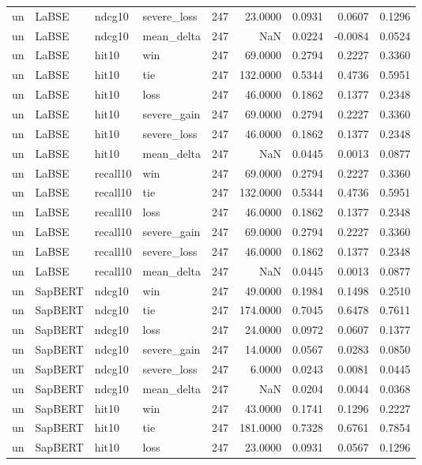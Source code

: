 \begin{tabular}{llllrrrrr}
un & LaBSE & ndcg10 & severe\_loss & 247 & 23.0000 & 0.0931 & 0.0607 & 0.1296 \\
un & LaBSE & ndcg10 & mean\_delta & 247 & NaN & 0.0224 & -0.0084 & 0.0524 \\
un & LaBSE & hit10 & win & 247 & 69.0000 & 0.2794 & 0.2227 & 0.3360 \\
un & LaBSE & hit10 & tie & 247 & 132.0000 & 0.5344 & 0.4736 & 0.5951 \\
un & LaBSE & hit10 & loss & 247 & 46.0000 & 0.1862 & 0.1377 & 0.2348 \\
un & LaBSE & hit10 & severe\_gain & 247 & 69.0000 & 0.2794 & 0.2227 & 0.3360 \\
un & LaBSE & hit10 & severe\_loss & 247 & 46.0000 & 0.1862 & 0.1377 & 0.2348 \\
un & LaBSE & hit10 & mean\_delta & 247 & NaN & 0.0445 & 0.0013 & 0.0877 \\
un & LaBSE & recall10 & win & 247 & 69.0000 & 0.2794 & 0.2227 & 0.3360 \\
un & LaBSE & recall10 & tie & 247 & 132.0000 & 0.5344 & 0.4736 & 0.5951 \\
un & LaBSE & recall10 & loss & 247 & 46.0000 & 0.1862 & 0.1377 & 0.2348 \\
un & LaBSE & recall10 & severe\_gain & 247 & 69.0000 & 0.2794 & 0.2227 & 0.3360 \\
un & LaBSE & recall10 & severe\_loss & 247 & 46.0000 & 0.1862 & 0.1377 & 0.2348 \\
un & LaBSE & recall10 & mean\_delta & 247 & NaN & 0.0445 & 0.0013 & 0.0877 \\
un & SapBERT & ndcg10 & win & 247 & 49.0000 & 0.1984 & 0.1498 & 0.2510 \\
un & SapBERT & ndcg10 & tie & 247 & 174.0000 & 0.7045 & 0.6478 & 0.7611 \\
un & SapBERT & ndcg10 & loss & 247 & 24.0000 & 0.0972 & 0.0607 & 0.1377 \\
un & SapBERT & ndcg10 & severe\_gain & 247 & 14.0000 & 0.0567 & 0.0283 & 0.0850 \\
un & SapBERT & ndcg10 & severe\_loss & 247 & 6.0000 & 0.0243 & 0.0081 & 0.0445 \\
un & SapBERT & ndcg10 & mean\_delta & 247 & NaN & 0.0204 & 0.0044 & 0.0368 \\
un & SapBERT & hit10 & win & 247 & 43.0000 & 0.1741 & 0.1296 & 0.2227 \\
un & SapBERT & hit10 & tie & 247 & 181.0000 & 0.7328 & 0.6761 & 0.7854 \\
un & SapBERT & hit10 & loss & 247 & 23.0000 & 0.0931 & 0.0567 & 0.1296 \\

\end{tabular}
